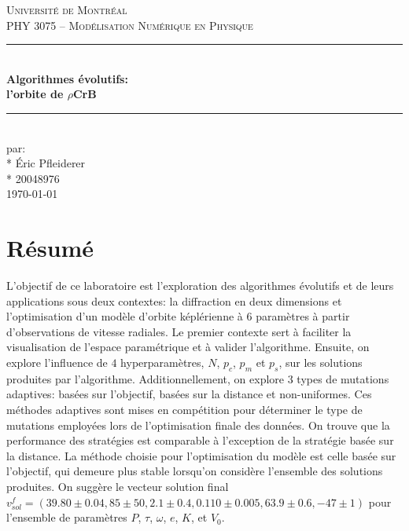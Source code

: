 \documentclass{article}
\begin{document}
	
\begin{titlepage}
	\centering
	\vspace*{1cm}
	\textsc{\LARGE Université de Montréal}\\[1cm] 
	\textsc{\Large PHY 3075 -- Modélisation Numérique en Physique}\\[3cm]
	\vspace{1cm}
	\rule{\linewidth}{0.5mm} \\[0.5cm]
	{\LARGE \bfseries Algorithmes évolutifs: \\ l'orbite de $\rho$CrB} \\[0.2cm]
	\rule{\linewidth}{0.5mm} \\[3cm]
	\vspace{1cm}
	\large par: \\*
	Éric Pfleiderer \\* 
	20048976\\[3cm] 
	\vspace{1cm}
	{\large \today}\\[3cm]
	\vfill
\end{titlepage}

\section*{Résumé}\label{sec:resume}

L'objectif de ce laboratoire est l'exploration des algorithmes évolutifs et de leurs applications sous deux contextes: la diffraction en deux dimensions et l'optimisation d'un modèle d'orbite képlérienne à $6$ paramètres à partir d'observations de vitesse radiales. Le premier contexte sert à faciliter la visualisation de l'espace paramétrique et à valider l'algorithme. Ensuite, on explore l'influence de $4$ hyperparamètres, $N$, $p_c$, $p_m$ et $p_s$, sur les solutions produites par l'algorithme. Additionnellement, on explore $3$ types de mutations adaptives: basées sur l'objectif, basées sur la distance et non-uniformes. Ces méthodes adaptives sont mises en compétition pour déterminer le type de mutations employées lors de l'optimisation finale des données. On trouve que la performance des stratégies est comparable à l'exception de la stratégie basée sur la distance. La méthode choisie pour l'optimisation du modèle est celle basée sur l'objectif, qui demeure plus stable lorsqu'on considère l'ensemble des solutions produites. On suggère le vecteur solution final $v^f_{sol} = (39.80\pm0.04, 85\pm50, 2.1\pm0.4, 0.110\pm0.005, 63.9\pm0.6, -47\pm1)$ pour l'ensemble de paramètres $P$, $\tau$, $\omega$, $e$, $K$, et $V_0$.
\end{document}

